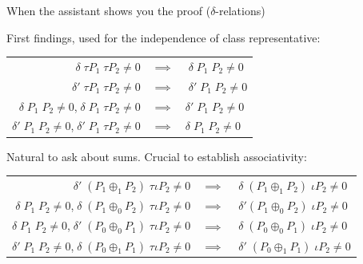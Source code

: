 \documentclass[10pt]{beamer}
\begin{document}
\begin{frame}{When the assistant shows you the proof ($\delta$-relations)}

First findings, used for the independence of class representative:

\begin{table}
	\begin{center}
		\begin{tabular}{ r c l }
			$\delta \; \tau P_1 \; \tau P_2 \neq 0$
			& $\implies$ & $\; \delta \; P_1 \; P_2 \neq 0$ \\ 
			$\delta' \; \tau P_1 \; \tau P_2 \neq 0$
			& $\implies$ & $\; \delta' \; P_1 \; P_2 \neq 0$ \\ 
			$\delta \; P_1 \; P_2 \neq 0$,\quad $\; \delta \; P_1 \; \tau P_2 \neq 0$
			& $\implies$ & $\delta' \; P_1 \; P_2 \neq 0$ \\ 
			$\delta' \; P_1 \; P_2 \neq 0$,\quad $\; \delta' \; P_1 \; \tau P_2 \neq 0$
			& $\implies$ & $\delta \; P_1 \;P_2 \neq 0$ \\
		\end{tabular}
	\end{center}
\end{table}

Natural to ask about sums. Crucial to establish associativity:

\begin{table}
	\begin{center}
		\begin{tabular}{ r c l }
			$\delta' \; (P_1 \oplus_1 P_2) \; \tau \iota P_2 \neq 0$
			& $\implies$ & $\; \delta \; (P_1 \oplus_1 P_2) \; \iota P_2 \neq 0$ \\ 
			$\delta \; P_1 \; P_2 \neq 0$,\quad $\; \delta \; (P_1 \oplus_0 P_2) \; \tau \iota P_2 \neq 0$
			& $\implies$ & $\; \delta' (P_1 \oplus_0 P_2) \; \iota P_2 \neq 0$ \\ 
			$\delta \; P_1 \; P_2 \neq 0$,\quad $\; \delta' \; (P_0 \oplus_0 P_1) \; \tau \iota P_2 \neq 0$
			& $\implies$ & $\; \delta \; (P_0 \oplus_0 P_1) \; \iota P_2 \neq 0$ \\ 	    
			$\delta' \; P_1 \; P_2 \neq 0$,\quad $\; \delta \; (P_0 \oplus_1 P_1) \; \tau \iota P_2 \neq 0$
			& $\implies$ & $\; \delta' \; (P_0 \oplus_1 P_1) \; \iota P_2 \neq 0$ \\
		\end{tabular}
	\end{center}
\end{table}
\end{frame}
\end{document}
